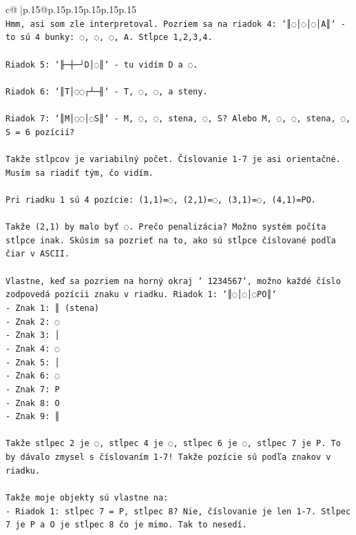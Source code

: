 \documentclass{article}
\begin{document}
{\begin{supertabular}{c@{$\;$}|p{.15\linewidth}@{}p{.15\linewidth}p{.15\linewidth}p{.15\linewidth}p{.15\linewidth}p{.15\linewidth}}
{{{\\ 
\texttt{Hmm, asi som zle interpretoval. Pozriem sa na riadok 4: `║◌│◌│◌│A║` {-} to sú 4 bunky: ◌, ◌, ◌, A. Stĺpce 1,2,3,4.} \\
\\ 
\texttt{Riadok 5: `╟─┼─┘D│◌║` {-} tu vidím D a ◌. } \\
\\ 
\texttt{Riadok 6: `║T│◌◌┌┴─╢` {-} T, ◌, ◌, a steny.} \\
\\ 
\texttt{Riadok 7: `║M│◌◌│◌S║` {-} M, ◌, ◌, stena, ◌, S? Alebo M, ◌, ◌, stena, ◌, S = 6 pozícií?} \\
\\ 
\texttt{Takže stĺpcov je variabilný počet. Číslovanie 1{-}7 je asi orientačné. Musím sa riadiť tým, čo vidím.} \\
\\ 
\texttt{Pri riadku 1 sú 4 pozície: (1,1)=◌, (2,1)=◌, (3,1)=◌, (4,1)=PO.} \\
\\ 
\texttt{Takže (2,1) by malo byť ◌. Prečo penalizácia? Možno systém počíta stĺpce inak. Skúsim sa pozrieť na to, ako sú stĺpce číslované podľa čiar v ASCII.} \\
\\ 
\texttt{Vlastne, keď sa pozriem na horný okraj ` 1234567`, možno každé číslo zodpovedá pozícii znaku v riadku. Riadok 1: `║◌│◌│◌PO║`} \\
\texttt{{-} Znak 1: ║ (stena)} \\
\texttt{{-} Znak 2: ◌} \\
\texttt{{-} Znak 3: │} \\
\texttt{{-} Znak 4: ◌} \\
\texttt{{-} Znak 5: │} \\
\texttt{{-} Znak 6: ◌} \\
\texttt{{-} Znak 7: P} \\
\texttt{{-} Znak 8: O} \\
\texttt{{-} Znak 9: ║} \\
\\ 
\texttt{Takže stĺpec 2 je ◌, stĺpec 4 je ◌, stĺpec 6 je ◌, stĺpec 7 je P. To by dávalo zmysel s číslovaním 1{-}7! Takže pozície sú podľa znakov v riadku. } \\
\\ 
\texttt{Takže moje objekty sú vlastne na:} \\
\texttt{{-} Riadok 1: stĺpec 7 = P, stĺpec 8? Nie, číslovanie je len 1{-}7. Stĺpec 7 je P a O je stĺpec 8 čo je mimo. Tak to nesedí.} \\
}}}
\end{supertabular}}
\end{document}
